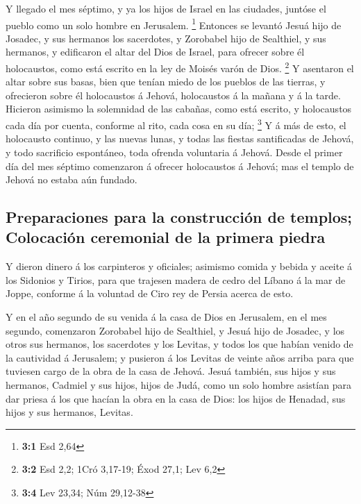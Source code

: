  Y llegado el mes séptimo, y ya los hijos de Israel en las
ciudades, juntóse el pueblo como un solo hombre en Jerusalem.
\footnote{\textbf{3:1} Esd 2,64}  Entonces se levantó
Jesuá hijo de Josadec, y sus hermanos los sacerdotes, y Zorobabel hijo
de Sealthiel, y sus hermanos, y edificaron el altar del Dios de Israel,
para ofrecer sobre él holocaustos, como está escrito en la ley de Moisés
varón de Dios. \footnote{\textbf{3:2} Esd 2,2; 1Cró 3,17-19; Éxod 27,1;
  Lev 6,2}  Y asentaron el altar sobre sus basas, bien que
tenían miedo de los pueblos de las tierras, y ofrecieron sobre él
holocaustos á Jehová, holocaustos á la mañana y á la tarde.
 Hicieron asimismo la solemnidad de las cabañas, como está
escrito, y holocaustos cada día por cuenta, conforme al rito, cada cosa
en su día; \footnote{\textbf{3:4} Lev 23,34; Núm 29,12-38}
 Y á más de esto, el holocausto continuo, y las nuevas
lunas, y todas las fiestas santificadas de Jehová, y todo sacrificio
espontáneo, toda ofrenda voluntaria á Jehová.  Desde el
primer día del mes séptimo comenzaron á ofrecer holocaustos á Jehová;
mas el templo de Jehová no estaba aún fundado.

\hypertarget{preparaciones-para-la-construcciuxf3n-de-templos-colocaciuxf3n-ceremonial-de-la-primera-piedra}{%
\subsection{Preparaciones para la construcción de templos; Colocación
ceremonial de la primera
piedra}\label{preparaciones-para-la-construcciuxf3n-de-templos-colocaciuxf3n-ceremonial-de-la-primera-piedra}}

 Y dieron dinero á los carpinteros y oficiales; asimismo
comida y bebida y aceite á los Sidonios y Tirios, para que trajesen
madera de cedro del Líbano á la mar de Joppe, conforme á la voluntad de
Ciro rey de Persia acerca de esto.

 Y en el año segundo de su venida á la casa de Dios en
Jerusalem, en el mes segundo, comenzaron Zorobabel hijo de Sealthiel, y
Jesuá hijo de Josadec, y los otros sus hermanos, los sacerdotes y los
Levitas, y todos los que habían venido de la cautividad á Jerusalem; y
pusieron á los Levitas de veinte años arriba para que tuviesen cargo de
la obra de la casa de Jehová.  Jesuá también, sus hijos y
sus hermanos, Cadmiel y sus hijos, hijos de Judá, como un solo hombre
asistían para dar priesa á los que hacían la obra en la casa de Dios:
los hijos de Henadad, sus hijos y sus hermanos, Levitas.


